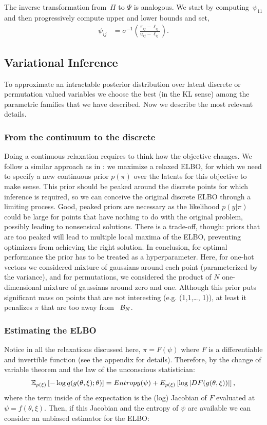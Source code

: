 \documentclass{article}
\begin{document}
The inverse transformation from~${\Pi}$ to $\Psi$ is analogous.
We start by computing~$\psi_{11}$ and then progressively compute
upper and lower bounds and set,
\begin{align}
\psi_{ij} &= \sigma^{-1} \left( \frac{{\pi}_{ij} - \ell_{ij}}{u_{ij} - \ell_{ij}} \right ).
\end{align}



 \subsection{Variational Inference}
To approximate an intractable posterior distribution over latent discrete or permutation valued variables we choose the best (in the KL sense) among the parametric families that we have described. Now we describe the most relevant details.

\subsubsection{From the continuum to the discrete}
Doing a continuous relaxation requires to think how the objective changes. We follow a similar approach as in \cite{maddison2016concrete}: we maximize a relaxed ELBO, for which we need to specify a new continuous prior $p(\pi)$ over the latents for this objective to make sense. This prior should be peaked around the discrete points for which inference is required, so we can conceive the original discrete ELBO through a limiting process. Good, peaked priors are necessary as the likelihood $p(y|\pi)$ could be large for points that have nothing to do with the original problem, possibly leading to nonsensical solutions. There is a trade-off, though: priors that are too peaked will lead to multiple local maxima of the ELBO, preventing optimizers from achieving the right solution. In conclusion, for optimal performance the prior has to be treated as a hyperparameter. Here, for one-hot vectors we considered mixture of gaussians around each point (parameterized by the variance), and for permutations, we considered the product of $N$ one-dimensional mixture of gaussians around zero and one. Although this prior puts significant mass on points that are not interesting (e.g. (1,1,\ldots, 1)), at least it penalizes $\pi$ that are too away from ~$\mathcal{B}_N$.


\subsubsection{Estimating the ELBO}
Notice in all the relaxations discussed here, $\pi = F(\psi)$ where $F$ is a differentiable and invertible function  (see the appendix for details). Therefore, by the change of variable theorem and the law of the unconscious statistician:
$$ \mathbb{E}_{p(\xi)} \left[- \log q(g(\theta, \xi); \theta) \right] = Entropy(\psi)+E_{p(\xi)}\left[\log | DF(g(\theta, \xi))|\right],$$
where the term inside of the expectation is the (log) Jacobian of $F$ evaluated at $\psi = f(\theta,\xi)$. Then, if this Jacobian and the entropy of $\psi$ are available we can consider an unbiased estimator for the ELBO:
\end{document}
